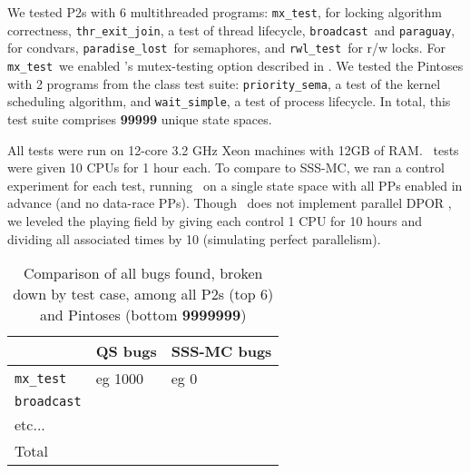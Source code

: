 \newcommand\mxtest{\texttt{mx\_test}}
\newcommand\tej{\texttt{thr\_exit\_join}}
\newcommand\bct{\texttt{broadcast}}
\newcommand\paraguay{\texttt{paraguay}}
\newcommand\paradise{\texttt{paradise\_lost}}
\newcommand\rwl{\texttt{rwl\_test}}
We tested P2s with 6 multithreaded programs:
\mxtest, for locking algorithm correctness, \tej, a test of thread lifecycle, \bct~and \paraguay, for condvars, \paradise~for semaphores, and \rwl~for r/w locks.
For \mxtest~we enabled \landslide's mutex-testing option described in \sect{\ref{sec:landslide}}.
\newcommand\prisema{\texttt{priority\_sema}}
\newcommand\waitsimple{\texttt{wait\_simple}}
We tested the Pintoses with 2 programs from the class test suite: \prisema, a test of the kernel scheduling algorithm, and \waitsimple, a test of process lifecycle. %
In total, this test suite comprises {\large \bf 99999} %
unique state spaces.

All tests were run on 12-core 3.2 GHz Xeon machines with 12GB of RAM.
\quicksand~tests were given 10 CPUs for 1 hour each.
To compare to SSS-MC, we ran a control experiment for each test, running \landslide~on a single state space with all PPs enabled in advance (and no data-race PPs).
Though \landslide~does not implement parallel DPOR \cite{parallel-dpor}, we leveled the playing field by giving each control 1 CPU for 10 hours and dividing all associated times by 10 (simulating perfect parallelism).

\begin{table}[t]
	\begin{tabular}{l|l|l}
			& QS bugs & SSS-MC bugs \\
		\hline
		\mxtest & eg 1000 & eg 0 \\
		\bct & & \\
		etc... & & \\
		\hline
		Total & & \\
	\end{tabular}
	\caption{Comparison of all bugs found, broken down by test case, among all P2s (top 6) and Pintoses (bottom {\bf \large 9999999})}
	\label{tab:allbugs}
\end{table}

